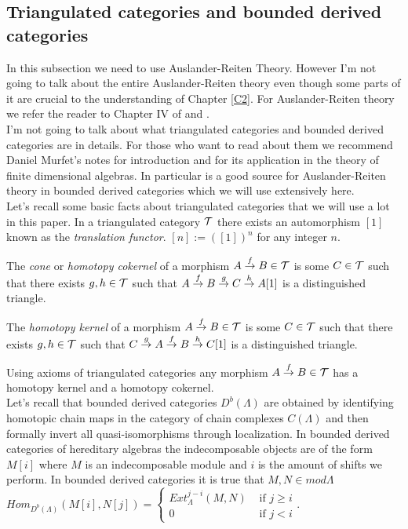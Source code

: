 \subsection{Triangulated categories and bounded derived categories}
\indent In this subsection we need to use Auslander-Reiten Theory. However I'm not going to talk about the entire Auslander-Reiten theory even though some parts of it are crucial to the understanding of Chapter \ref{C2}. For Auslander-Reiten theory we refer the reader to Chapter IV of \cite{ASS06} and \cite{ARS}.\\
\indent I'm not going to talk about what triangulated categories and bounded derived categories are in details. For those who want to read about them we recommend Daniel Murfet's notes \cite{MurD1}\cite{MurD2}\cite{MurT1} for introduction and \cite{H88} for its application in the theory of finite dimensional algebras. In particular \cite{H88} is a good source for Auslander-Reiten theory in bounded derived categories which we will use extensively here.\\
\indent Let's recall some basic facts about triangulated categories that we will use a lot in this paper. In a triangulated category $\mathcal{T}$ there exists an automorphism $[1]$ known as the \textit{translation functor}. $[n]:=([1])^n$ for any integer $n$.\\
\begin{definition}
The \textit{cone} or \textit{homotopy cokernel} of a morphism $A\overset{f}{\to}B\in\mathcal{T}$ is some $C\in\mathcal{T}$ such that there exists $g,h\in\mathcal{T}$ such that $A\overset{f}{\to} B\overset{g}{\to} C\overset{h}{\to} A[1]$ is a distinguished triangle.
\end{definition}
\begin{definition}
The \textit{homotopy kernel} of a morphism $A\overset{f}{\to}B\in\mathcal{T}$ is some $C\in\mathcal{T}$ such that there exists $g,h\in\mathcal{T}$ such that $C\overset{g}{\to} A\overset{f}{\to} B\overset{h}{\to} C[1]$ is a distinguished triangle.
\end{definition}
\indent Using axioms of triangulated categories any morphism $A\overset{f}{\to}B\in\mathcal{T}$ has a homotopy kernel and a homotopy cokernel.\\
\indent Let's recall that bounded derived categories $D^b(\Lambda)$ are obtained by identifying homotopic chain maps in the category of chain complexes $C({\Lambda})$ and then formally invert all quasi-isomorphisms through localization. In bounded derived categories of hereditary algebras the indecomposable objects are of the form $M[i]$ where $M$ is an indecomposable module and $i$ is the amount of shifts we perform. In bounded derived categories it is true that $M,N\in mod\Lambda$ $Hom_{D^b(\Lambda)}(M[i],N[j])=\begin{cases}
Ext_{\Lambda}^{j-i}(M,N) & \text{ if }j\geq i\\
0 & \text{ if }j<i
\end{cases}$.\\
